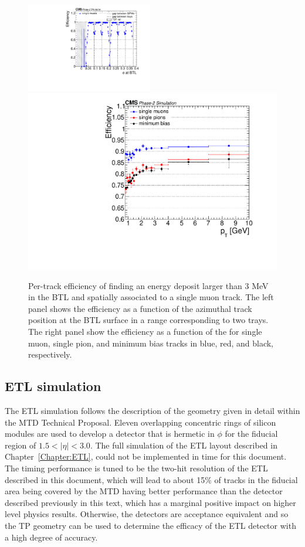 \begin{figure}[hbtp]
\centering
\includegraphics[width=0.49\textwidth]{fig/performance/c_all_efficiency_vs_phi.pdf}
\includegraphics[width=0.49\linewidth]{fig/performance/c_all_efficiency_vs_pt.pdf}
\caption{Per-track efficiency of finding an energy deposit larger than 3 MeV in the BTL and spatially associated to a single muon track. The left panel shows the efficiency as a function of the azimuthal track position at the BTL surface in a range corresponding to two trays. The right panel show the efficiency as a function of the \pt for single muon, single pion, and minimum bias tracks in blue, red, and black, respectively.}
\label{fig:BTL_efficiency_pos}
\end{figure}


\subsection{ETL simulation}

The ETL simulation follows the description of the geometry given in detail within the MTD Technical Proposal. Eleven overlapping concentric rings of silicon modules are used to develop a detector that is hermetic in $\phi$ for the fiducial region of $1.5 < |\eta| < 3.0$. The full simulation of the ETL layout described in Chapter~\ref{Chapter:ETL}, could not be implemented in time for this document. The timing performance is tuned to
be the two-hit resolution of the ETL described in this document, which will lead to about 15\% of tracks in the fiducial area being covered by the MTD having better performance than the detector described previously in this text, which has a marginal positive impact on higher level physics results. Otherwise, the detectors are acceptance equivalent and so the TP geometry can be used to determine the efficacy of the ETL detector with a high degree of accuracy.

